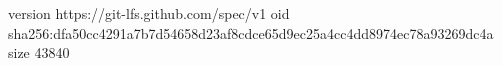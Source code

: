 version https://git-lfs.github.com/spec/v1
oid sha256:dfa50cc4291a7b7d54658d23af8cdce65d9ec25a4cc4dd8974ec78a93269dc4a
size 43840
